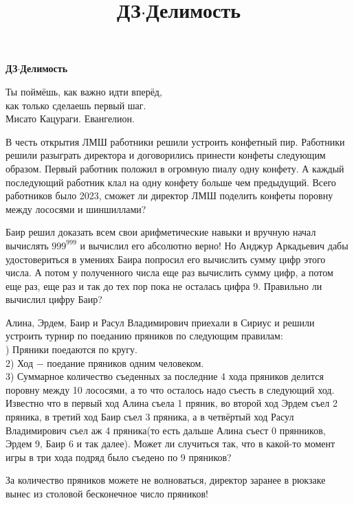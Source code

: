 \centerline{\bf \Huge ДЗ$\cdot$Делимость}
\title{ДЗ$\cdot$Делимость}

\begin{flushright}
    \scriptsize Ты поймёшь, как важно идти вперёд, \\как только сделаешь первый шаг.\\
    Мисато Кацураги. Евангелион.
\end{flushright}

В честь открытия ЛМШ работники решили устроить конфетный пир. Работники решили разыграть директора и договорились принести конфеты следующим образом. Первый работник положил в огромную пиалу одну конфету. А каждый последующий работник клал на одну конфету больше чем предыдущий. Всего работников было 2023, сможет ли директор ЛМШ поделить конфеты поровну между лососями и шиншиллами?

Баир решил доказать всем свои арифметические навыки и вручную начал вычислять $999^{999}$ и вычислил его абсолютно верно! Но Анджур Аркадьевич дабы удостовериться в умениях Баира попросил его вычислить сумму цифр этого числа. А потом у полученного числа еще раз вычислить сумму цифр, а потом еще раз, еще раз и так до тех пор пока не осталась цифра 9. Правильно ли вычислил цифру Баир?

Алина, Эрдем, Баир и Расул Владимирович приехали в Сириус и решили устроить турнир по поеданию пряников по следующим правилам: \\

) Пряники поедаются по кругу.\\
2) Ход $-$ поедание пряников одним человеком.\\
3) Суммарное количество съеденных за последние 4 хода пряников делится поровну между 10 лососями, а то что осталось надо съесть в следующий ход.\\

Известно что в первый ход Алина съела 1 пряник, во второй ход Эрдем съел 2 пряника, в третий ход Баир съел 3 пряника, а в четвёртый ход Расул Владимирович съел аж 4 пряника(то есть дальше Алина съест 0 прянников, Эрдем 9, Баир 6 и так далее). Может ли случиться так, что в какой-то момент игры в три хода подряд было съедено по 9 пряников?

За количество пряников можете не волноваться, директор заранее в рюкзаке вынес из столовой бесконечное число пряников!